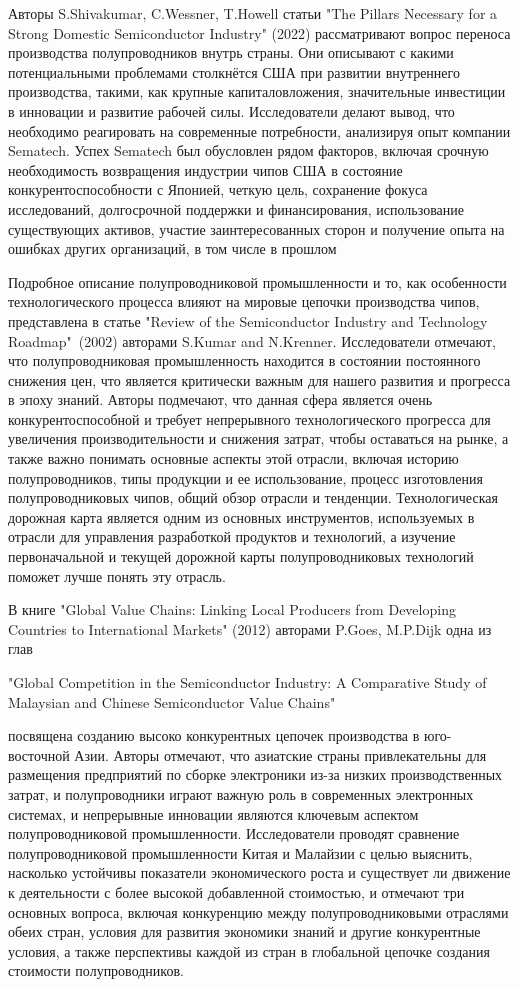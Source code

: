 \documentclass[14pt, a4paper]{extarticle}
\begin{document}
Авторы S.Shivakumar, C.Wessner, T.Howell статьи "The Pillars Necessary for a Strong Domestic Semiconductor Industry" (2022) рассматривают вопрос переноса производства полупроводников внутрь страны. Они описывают с какими потенциальными проблемами столкнётся США при развитии внутреннего производства, такими, как крупные капиталовложения, значительные инвестиции в инновации и развитие рабочей силы. Исследователи делают вывод, что необходимо реагировать на современные потребности, анализируя опыт компании Sematech. Успех Sematech был обусловлен рядом факторов, включая срочную необходимость возвращения индустрии чипов США в состояние конкурентоспособности с Японией, четкую цель, сохранение фокуса исследований, долгосрочной поддержки и финансирования, использование существующих активов, участие заинтересованных сторон и получение опыта на ошибках других организаций, в том числе в прошлом

Подробное описание полупроводниковой промышленности и то, как особенности технологического процесса влияют на мировые цепочки производства чипов, представлена в статье "Review of the Semiconductor Industry and Technology Roadmap"\ (2002) авторами S.Kumar and N.Krenner. Исследователи отмечают, что полупроводниковая промышленность находится в состоянии постоянного снижения цен, что является критически важным для нашего развития и прогресса в эпоху знаний. Авторы подмечают, что данная сфера является очень конкурентоспособной и требует непрерывного технологического прогресса для увеличения производительности и снижения затрат, чтобы оставаться на рынке, а также важно понимать основные аспекты этой отрасли, включая историю полупроводников, типы продукции и ее использование, процесс изготовления полупроводниковых чипов, общий обзор отрасли и тенденции. Технологическая дорожная карта является одним из основных инструментов, используемых в отрасли для управления разработкой продуктов и технологий, а изучение первоначальной и текущей дорожной карты полупроводниковых технологий поможет лучше понять эту отрасль.

В книге "Global Value Chains: Linking Local Producers from Developing Countries to International Markets" (2012) авторами P.Goes, M.P.Dijk одна из глав \begin{english} "Global Competition in the Semiconductor Industry: A Comparative Study of Malaysian and Chinese Semiconductor Value Chains" \end{english} посвящена созданию высоко конкурентных цепочек производства в юго-восточной Азии. Авторы отмечают, что азиатские страны привлекательны для размещения предприятий по сборке электроники из-за низких производственных затрат, и полупроводники играют важную роль в современных электронных системах, и непрерывные инновации являются ключевым аспектом полупроводниковой промышленности. Исследователи проводят сравнение полупроводниковой промышленности Китая и Малайзии с целью выяснить, насколько устойчивы показатели экономического роста и существует ли движение к деятельности с более высокой добавленной стоимостью, и отмечают три основных вопроса, включая конкуренцию между полупроводниковыми отраслями обеих стран, условия для развития экономики знаний и другие конкурентные условия, а также перспективы каждой из стран в глобальной цепочке создания стоимости полупроводников.
\end{document}
